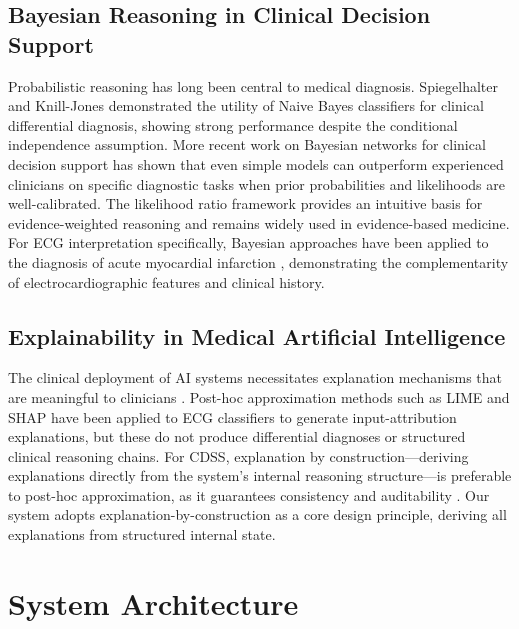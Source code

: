 \documentclass[journal]{IEEEtran}
\begin{document}
\subsection{Bayesian Reasoning in Clinical Decision Support}

Probabilistic reasoning has long been central to medical diagnosis.
Spiegelhalter and Knill-Jones \cite{spiegelhalter1986probabilistic}
demonstrated the utility of Naive Bayes classifiers for clinical
differential diagnosis, showing strong performance despite the
conditional independence assumption.
More recent work on Bayesian networks for clinical decision support
\cite{lucas2004bayesian} has shown that even simple models can
outperform experienced clinicians on specific diagnostic tasks when
prior probabilities and likelihoods are well-calibrated.
The likelihood ratio framework \cite{deeks2004likelihood} provides
an intuitive basis for evidence-weighted reasoning and remains
widely used in evidence-based medicine.
For ECG interpretation specifically, Bayesian approaches have been
applied to the diagnosis of acute myocardial infarction
\cite{kennedy1996bayesian}, demonstrating the complementarity of
electrocardiographic features and clinical history.

\subsection{Explainability in Medical Artificial Intelligence}

The clinical deployment of AI systems necessitates explanation
mechanisms that are meaningful to clinicians \cite{caruana2015intelligible}.
Post-hoc approximation methods such as LIME \cite{ribeiro2016lime}
and SHAP \cite{lundberg2017unified} have been applied to ECG
classifiers to generate input-attribution explanations, but these
do not produce differential diagnoses or structured clinical reasoning
chains.
For CDSS, explanation by construction—deriving explanations directly
from the system's internal reasoning structure—is preferable to
post-hoc approximation, as it guarantees consistency and
auditability \cite{shortliffe2001biomedical}.
Our system adopts explanation-by-construction as a core design
principle, deriving all explanations from structured internal state.

\section{System Architecture}
\label{sec:arch}
\end{document}
